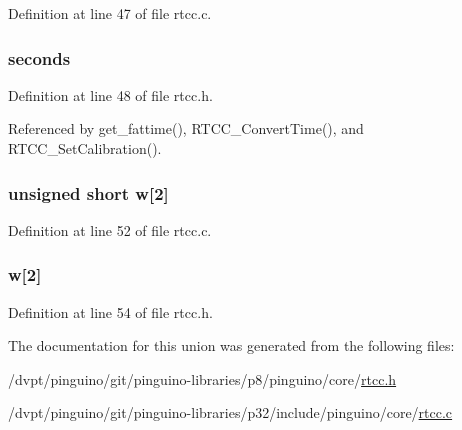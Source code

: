 Definition at line 47 of file rtcc.\-c.

\hypertarget{unionrtcc_time_ae53e173daf8fcf970bb3324ae545f21c}{
\subsubsection[{seconds}]{ seconds}}\label{unionrtcc_time_ae53e173daf8fcf970bb3324ae545f21c}


Definition at line 48 of file rtcc.\-h.



Referenced by get\-\_\-fattime(), R\-T\-C\-C\-\_\-\-Convert\-Time(), and R\-T\-C\-C\-\_\-\-Set\-Calibration().

\hypertarget{unionrtcc_time_acd7a32916d80e0556e2e0348be16a805}{
\subsubsection[{w}]{\setlength{\rightskip}{0pt plus 5cm}unsigned short w\mbox{[}2\mbox{]}}}\label{unionrtcc_time_acd7a32916d80e0556e2e0348be16a805}


Definition at line 52 of file rtcc.\-c.

\hypertarget{unionrtcc_time_aee6ae13fa41deb7b244fe96f8b34be1d}{
\subsubsection[{w}]{ w\mbox{[}2\mbox{]}}}\label{unionrtcc_time_aee6ae13fa41deb7b244fe96f8b34be1d}


Definition at line 54 of file rtcc.\-h.



The documentation for this union was generated from the following files\-:\begin{DoxyCompactItemize}
\item 
/dvpt/pinguino/git/pinguino-\/libraries/p8/pinguino/core/\hyperlink{rtcc_8h}{rtcc.\-h}\item 
/dvpt/pinguino/git/pinguino-\/libraries/p32/include/pinguino/core/\hyperlink{p32_2include_2pinguino_2core_2rtcc_8c}{rtcc.\-c}\end{DoxyCompactItemize}
